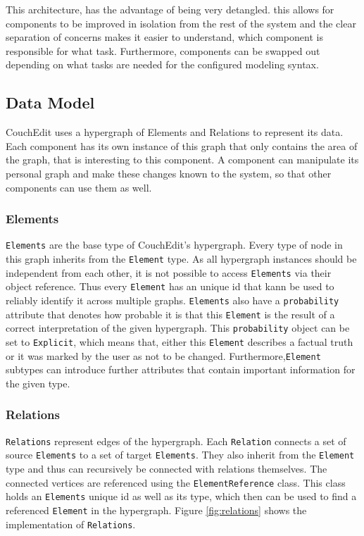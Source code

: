 This architecture, has the advantage of being very detangled. this allows for components to be improved in isolation from the rest of the system and the clear separation of concerns makes it easier to understand, which component is responsible for what task. Furthermore, components can be swapped out depending on what tasks are needed for the configured modeling syntax.



\subsection{Data Model}
CouchEdit uses a hypergraph of Elements and Relations to represent its data. Each component has its own instance of this graph that only contains the area of the graph, that is interesting to this component. A component can manipulate its personal graph and make these changes known to the system, so that other components can use them as well.


\subsubsection{Elements}
\texttt{Elements} are the base type of CouchEdit's hypergraph. Every type of node in this graph inherits from the \texttt{Element} type. As all hypergraph instances should be independent from each other, it is not possible to access \texttt{Elements} via their object reference. Thus every \texttt{Element} has an unique id that kann be used to reliably identify it across multiple graphs. \texttt{Elements} also have a \texttt{probability} attribute that denotes how probable it is that this \texttt{Element} is the result of a correct interpretation of the given hypergraph. This \texttt{probability} object can be set to \texttt{Explicit}, which means that, either this \texttt{Element} describes a factual truth or it was marked by the user as not to be changed. Furthermore,\texttt{Element} subtypes can introduce further attributes that contain important information for the given type.

\subsubsection{Relations}
\texttt{Relations} represent edges of the hypergraph. Each \texttt{Relation} connects a set of source \texttt{Elements} to a set of target \texttt{Elements}. They also inherit from the \texttt{Element} type and thus can recursively be connected with relations themselves. The connected vertices are referenced using the \texttt{ElementReference} class. This class holds an \texttt{Elements} unique id as well as its type, which then can be used to find a referenced \texttt{Element} in the hypergraph. Figure \ref{fig:relations} shows the implementation of \texttt{Relations}. 

